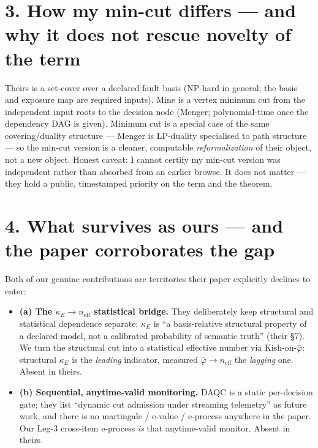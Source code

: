 \documentclass[11pt,a4paper]{article}
\begin{document}
\section*{3. How my min-cut differs --- and why it does not rescue novelty of the term}

Theirs is a set-cover over a declared fault basis (NP-hard in general; the basis and
exposure map are required inputs). Mine is a vertex minimum cut from the independent
input roots to the decision node (Menger; polynomial-time once the dependency DAG is
given). Minimum cut is a special case of the same covering/duality structure --- Menger
is LP-duality specialised to path structure --- so the min-cut version is a cleaner,
computable \emph{reformalization} of their object, not a new object. Honest caveat: I
cannot certify my min-cut version was independent rather than absorbed from an earlier
browse. It does not matter --- they hold a public, timestamped priority on the term and
the theorem.

\section*{4. What survives as ours --- and the paper corroborates the gap}

Both of our genuine contributions are territories their paper explicitly declines to
enter:

\begin{itemize}
  \item \textbf{(a) The $\kappa_E \to n_{\mathrm{eff}}$ statistical bridge.} They
        deliberately keep structural and statistical dependence separate; $\kappa_E$ is
        ``a basis-relative structural property of a declared model, not a calibrated
        probability of semantic truth'' (their \S7). We turn the structural cut into a
        statistical effective number via Kish-on-$\bar{\varphi}$: structural $\kappa_E$
        is the \emph{leading} indicator, measured
        $\bar{\varphi} \to n_{\mathrm{eff}}$ the \emph{lagging} one. Absent in theirs.

  \item \textbf{(b) Sequential, anytime-valid monitoring.} DAQC is a static
        per-decision gate; they list ``dynamic cut admission under streaming telemetry''
        as future work, and there is no martingale / e-value / e-process anywhere in
        the paper. Our Leg-3 cross-item e-process \emph{is} that anytime-valid monitor.
        Absent in theirs.
\end{itemize}
\end{document}
